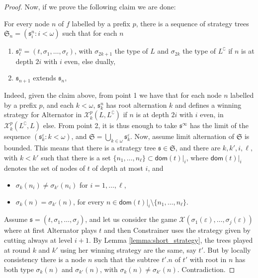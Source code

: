 \documentclass{llncs}
\newcommand {\dom}{\mathsf{dom}}
\begin{document}
\begin{proof}
Now, if we prove the following claim we are done:
\begin{claim}\label{claim:strategy}
For every node $n$ of $f$ labelled by a prefix $p$, 
there is a sequence of strategy trees $\mathfrak{S}_n=(\mathfrak{s}^n_i: i < \omega)$ such that for each $n$
\begin{enumerate}
\item $\mathfrak{s}^n_\ell=(t, \sigma_1, \dots, \sigma_\ell)$, with $\sigma_{2k+1}$ the type of $L$ and $\sigma_{2k}$ the type of  $L^\complement$ if $n$ is at depth $2i$ with $i$ even, else dually,
\item $\mathfrak{s}_{n+1}$ extends $\mathfrak{s}_n$,
\end{enumerate}
\end{claim}
Indeed, given the claim above, from point 1 we have that
for each node $n$ labelled by a prefix $p$, and each $k < \omega$, $\mathfrak{s}^n_k$ has root alternation $k$ and defines a winning strategy for Alternator in $\mathcal{X}^p_k(L, L^\complement)$ if $n$ is at depth $2i$ with $i$ even, in $\mathcal{X}^p_k(L^\complement, L)$ else.
From point 2, it is thus enough to take $\mathfrak{s}^\infty$ has the limit of the sequence $(\mathfrak{s}^\varepsilon_k: k < \omega)$, and $\mathfrak{S}=\bigcup_{k \in \omega} \mathfrak{s}^\varepsilon_k$. 
Now, assume limit alternation of $\mathfrak{S}$ is bounded.
This means that there is a strategy tree $\mathfrak{s} \in \mathfrak{S}$, and there are $k, k', i, \ell, $ with $k < k'$ such that
 there is a set $\{n_1, \dots, n_\ell\} \subset \dom(t)|_i$, where $\dom(t)|_i$ denotes the set of nodes of $t$ of depth at most $i$, and
\begin{itemize}
\item $\sigma_k(n_i)\neq \sigma_{k'}(n_i)$ for $i=1, \dots, \ell$,
\item $\sigma_k(n)= \sigma_{k'}(n)$, for every $n \in \dom(t)|_i \setminus \{n_1, \dots, n_\ell\}$.
\end{itemize}
Assume $\mathfrak{s}=(t, \sigma_1, \dots, \sigma_j)$, and let us consider the game $\mathcal{X}( \sigma_1(\varepsilon), \dots, \sigma_j(\varepsilon))$ where at first Alternator plays $t$ and then Constrainer uses the strategy given by cutting always at level $i+1$. By Lemma \ref{lemma:short_strategy}, the trees played at round $k$ and $k'$ using her winning strategy are the same, say $t'$. But by locally consistency there is a node $n$ such that the subtree $t'.n$ of $t'$ with root in $n$ has both type $\sigma_k(n)$ and $\sigma_{k'}(n)$, with $\sigma_k(n) \neq \sigma_{k'}(n)$. Contradiction.




\end{proof}
\end{document}
